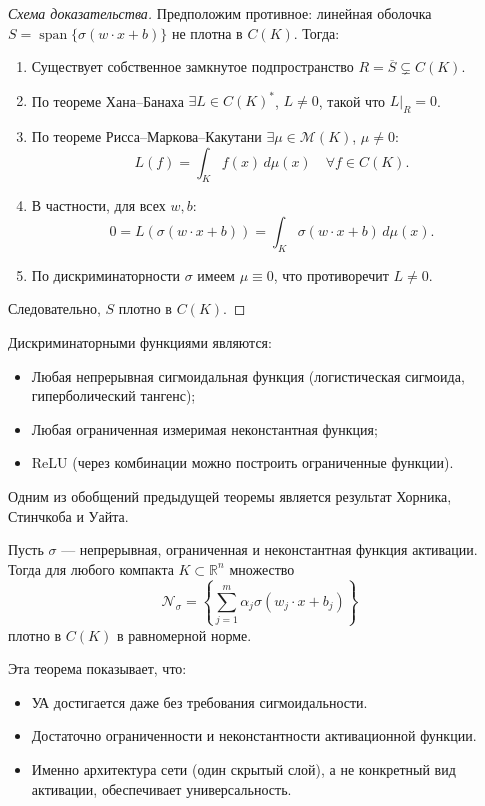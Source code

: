 \documentclass[../NDCNNAI_main.tex]{subfiles}
\begin{document}
\begin{proof}[Схема доказательства]
Предположим противное: линейная оболочка $S = \operatorname{span}\{\sigma(w\cdot x + b)\}$ не плотна в $C(K)$. Тогда:
\begin{enumerate}[label=\arabic*)]
    \item Существует собственное замкнутое подпространство $R = \overline{S} \subsetneq C(K)$.
    \item По теореме Хана–Банаха $\exists L \in C(K)^*$, $L \neq 0$, такой что $L\big|_R = 0$.
    \item По теореме Рисса–Маркова–Какутани $\exists \mu \in \mathcal{M}(K)$, $\mu \neq 0$:
    \[
    L(f) = \int_K f(x)\,d\mu(x) \quad \forall f \in C(K).
    \]
    \item В частности, для всех $w, b$:
    \[
    0 = L(\sigma(w\cdot x + b)) = \int_K \sigma(w\cdot x + b)\,d\mu(x).
    \]
    \item По дискриминаторности $\sigma$ имеем $\mu \equiv 0$, что противоречит $L \neq 0$.
\end{enumerate}
Следовательно, $S$ плотно в $C(K)$.
\end{proof}

\begin{example}
Дискриминаторными функциями являются:\\
\begin{itemize}
    \item Любая непрерывная сигмоидальная функция (логистическая сигмоида, гиперболический тангенс);
    \item Любая ограниченная измеримая неконстантная функция;
    \item ReLU (через комбинации можно построить ограниченные функции).
\end{itemize}
\end{example}
Одним из обобщений предыдущей теоремы является результат Хорника, Стинчкоба и Уайта.
\begin{theorem}
Пусть $\sigma$ — непрерывная, ограниченная и неконстантная функция активации. Тогда для любого компакта $K \subset \mathbb{R}^n$ множество
\[
\mathcal{N}_\sigma = \left\{ \sum_{j=1}^{m} \alpha_j \sigma(w_j \cdot x + b_j) \right\}
\]
плотно в $C(K)$ в равномерной норме.
\end{theorem}

\begin{remark}
Эта теорема показывает, что:
\begin{itemize}
    \item УА достигается даже без требования сигмоидальности.
    \item Достаточно ограниченности и неконстантности активационной функции.
    \item Именно архитектура сети (один скрытый слой), а не конкретный вид активации, обеспечивает универсальность.
\end{itemize}
\end{remark}
\end{document}
